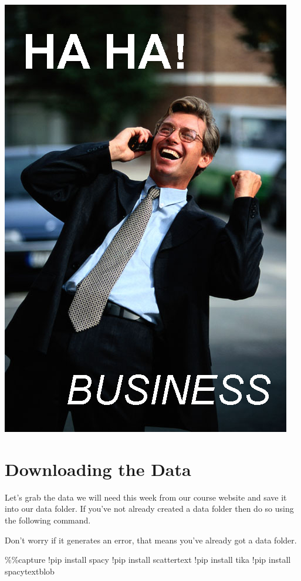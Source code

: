 \documentclass[
  letterpaper,
  DIV=11,
  numbers=noendperiod]{scrreprt}
\newenvironment{Shaded}{\begin{snugshade}}{\end{snugshade}}
\newcommand{\NormalTok}[1]{\textcolor[rgb]{0.00,0.23,0.31}{#1}}
\newcommand{\OperatorTok}[1]{\textcolor[rgb]{0.37,0.37,0.37}{#1}}
\begin{document}
\includegraphics{index_files/mediabag/business.jpg}

\hypertarget{downloading-the-data-1}{%
\section{Downloading the Data}\label{downloading-the-data-1}}

Let's grab the data we will need this week from our course website and
save it into our data folder. If you've not already created a data
folder then do so using the following command.

Don't worry if it generates an error, that means you've already got a
data folder.

\begin{Shaded}
\begin{Highlighting}[]
\OperatorTok{\%\%}\NormalTok{capture}
\OperatorTok{!}\NormalTok{pip install spacy}
\OperatorTok{!}\NormalTok{pip install scattertext}
\OperatorTok{!}\NormalTok{pip install tika}
\OperatorTok{!}\NormalTok{pip install spacytextblob}
\end{Highlighting}
\end{Shaded}
\end{document}
